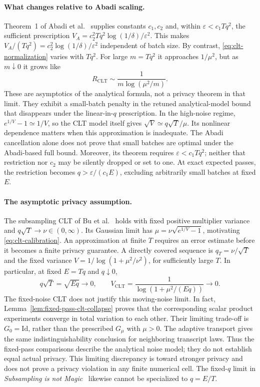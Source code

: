 \documentclass[11pt]{article}
\begin{document}
\paragraph{What changes relative to Abadi scaling.}
Theorem~1 of Abadi et al.~\cite{abadi} supplies constants $c_1,c_2$
and, within $\varepsilon<c_1Tq^2$, the sufficient prescription
$V_A=c_2^2Tq^2\log(1/\delta)/\varepsilon^2$. This makes
$V_A/(Tq^2)=c_2^2\log(1/\delta)/\varepsilon^2$ independent of batch size.
By contrast, \eqref{eq:clt-normalization} varies with $Tq^2$. For large
$m=Tq^2$ it approaches $1/\mu^2$, but as $m\downarrow0$ it grows like
\[
 R_{\mathrm{CLT}}\sim\frac{1}{m\log(\mu^2/m)}.
\]
These are asymptotics of the analytical formula, not a privacy theorem in
that limit. They exhibit a small-batch penalty in the retuned analytical-model
bound that disappears under the linear-in-$q$ prescription. In the high-noise regime,
$e^{1/V}-1\simeq1/V$, so the CLT model itself gives
$\sqrt V\simeq q\sqrt T/\mu$. Its nonlinear dependence matters when this
approximation is inadequate. The Abadi cancellation alone does not prove
that small batches are optimal under the Abadi-based full bound. Moreover,
its theorem requires $\varepsilon<c_1Tq^2$; neither that restriction nor
$c_2$ may be silently dropped or set to one. At exact expected passes,
the restriction becomes $q>\varepsilon/(c_1E)$, excluding arbitrarily
small batches at fixed $E$.

\paragraph{The asymptotic privacy assumption.}\label{par:clt-scope}
The subsampling CLT of Bu et al.~\cite[Appendix B.2, Theorem 6 and
Lemma B.1]{bu2020deepgdp} holds with fixed
positive multiplier variance and $q\sqrt T\to\nu\in(0,\infty)$. Its
Gaussian limit has $\mu=\nu\sqrt{e^{1/V}-1}$, motivating
\eqref{eq:clt-calibration}. An approximation at finite $T$ requires an
error estimate before it becomes a finite privacy guarantee. A directly
covered sequence is $q_T=\nu/\sqrt T$ and the fixed variance
$V=1/\log(1+\mu^2/\nu^2)$, for sufficiently large $T$.
In particular, at fixed $E=Tq$ and $q\downarrow0$,
\[
 q\sqrt T=\sqrt{Eq}\longrightarrow0,\qquad
 V_{\mathrm{CLT}}=\frac{1}{\log(1+\mu^2/(Eq))}\longrightarrow0.
\]
The fixed-noise CLT does not justify this moving-noise limit. In fact,
Lemma~\ref{lem:fixed-pass-clt-collapse} proves that the corresponding
scalar product experiments converge in total variation to each other.
Their limiting trade-off is $G_0=\mathrm{Id}$, rather than the prescribed
$G_\mu$ with $\mu>0$. The adaptive transport gives the same
indistinguishability conclusion for neighboring transcript laws.
Thus the fixed-pass comparisons describe the analytical noise model;
they do not establish equal actual privacy. This limiting discrepancy
is toward stronger privacy and does not prove a privacy violation in any
finite numerical cell. The fixed-$q$ limit in \emph{Subsampling is not
Magic}~\cite{snm} likewise cannot be specialized to $q=E/T$.
\end{document}
